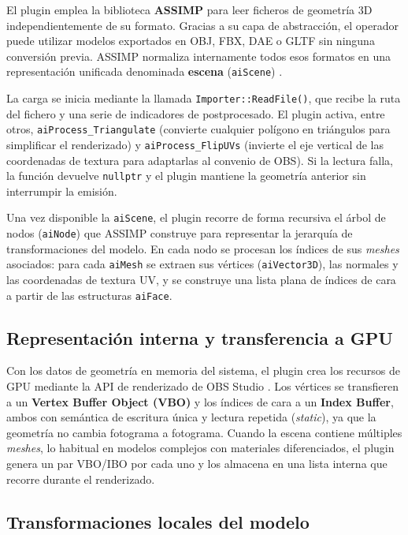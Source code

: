 El plugin emplea la biblioteca \textbf{ASSIMP} \citep{assimp_github} para leer ficheros de geometría 3D independientemente de su formato. Gracias a su capa de abstracción, el operador puede utilizar modelos exportados en OBJ, FBX, DAE o GLTF sin ninguna conversión previa. ASSIMP normaliza internamente todos esos formatos en una representación unificada denominada \textbf{escena} (\texttt{aiScene}) \citep{assimp_import_file}.

La carga se inicia mediante la llamada \texttt{Importer::ReadFile()}, que recibe la ruta del fichero y una serie de indicadores de postprocesado. El plugin activa, entre otros, \texttt{aiProcess\_Triangulate} (convierte cualquier polígono en triángulos para simplificar el renderizado) y \texttt{aiProcess\_FlipUVs} (invierte el eje vertical de las coordenadas de textura para adaptarlas al convenio de OBS). Si la lectura falla, la función devuelve \texttt{nullptr} y el plugin mantiene la geometría anterior sin interrumpir la emisión.

Una vez disponible la \texttt{aiScene}, el plugin recorre de forma recursiva el árbol de nodos (\texttt{aiNode}) que ASSIMP construye para representar la jerarquía de transformaciones del modelo. En cada nodo se procesan los índices de sus \textit{meshes} asociados: para cada \texttt{aiMesh} se extraen sus vértices (\texttt{aiVector3D}), las normales y las coordenadas de textura UV, y se construye una lista plana de índices de cara a partir de las estructuras \texttt{aiFace}.

\subsection{Representación interna y transferencia a GPU}
\label{subsec:transferencia_gpu}

Con los datos de geometría en memoria del sistema, el plugin crea los recursos de GPU mediante la API de renderizado de OBS Studio \citep{obs_graphics_api}. Los vértices se transfieren a un \textbf{Vertex Buffer Object (VBO)} y los índices de cara a un \textbf{Index Buffer}, ambos con semántica de escritura única y lectura repetida (\textit{static}), ya que la geometría no cambia fotograma a fotograma. Cuando la escena contiene múltiples \textit{meshes}, lo habitual en modelos complejos con materiales diferenciados, el plugin genera un par VBO/IBO por cada uno y los almacena en una lista interna que recorre durante el renderizado.

\subsection{Transformaciones locales del modelo}
\label{subsec:transformaciones_modelo}

